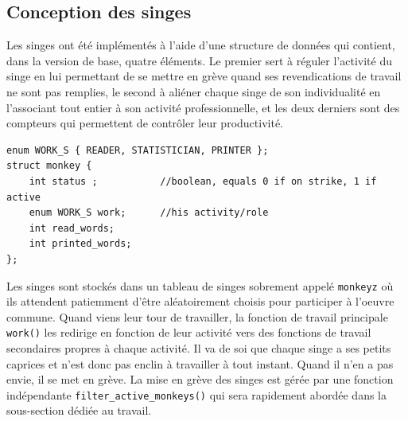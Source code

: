 \documentclass{article}
\begin{document}
\subsection{Conception des singes}
Les singes ont été implémentés à l'aide d'une structure de données qui contient, dans la version de base, quatre éléments. Le premier sert à réguler l'activité du singe en lui permettant de se mettre en grève quand ses revendications de travail ne sont pas remplies, le second à aliéner chaque singe de son individualité en l'associant tout entier à son activité professionnelle, et les deux derniers sont des compteurs qui permettent de contrôler leur productivité.
\begin{verbatim}
enum WORK_S { READER, STATISTICIAN, PRINTER };
struct monkey {
    int status ;           //boolean, equals 0 if on strike, 1 if active
    enum WORK_S work;      //his activity/role
    int read_words;
    int printed_words;
};
\end{verbatim}
\newpage
Les singes sont stockés dans un tableau de singes sobrement appelé \verb'monkeyz' où ils attendent patiemment d'être aléatoirement choisis pour participer à l'oeuvre commune. Quand viens leur tour de travailler, la fonction de travail principale \verb'work()' les redirige en fonction de leur activité vers des fonctions de travail secondaires propres à chaque activité.
Il va de soi que chaque singe a ses petits caprices et n'est donc pas enclin à travailler à tout instant. Quand il n'en a pas envie, il se met en grève. %
La mise en grève des singes est gérée par une fonction indépendante \verb'filter_active_monkeys()' qui sera rapidement abordée dans la sous-section dédiée au travail.
\end{document}
